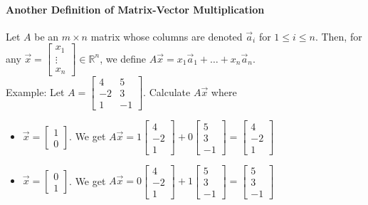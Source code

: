 \documentclass[10pt,letter]{article}
\begin{document}
\paragraph{Another Definition of Matrix-Vector Multiplication} Let $A$ be an $m\times n$ matrix whose columns are denoted $\vec{a}_i$ for $1\leq i\leq n$. Then, for any $\vec{x}=\begin{bmatrix}x_1\\\vdots\\x_n\end{bmatrix}\in\mathbb{R}^n$, we define $A\vec{x}=x_1\vec{a}_1+\ldots+x_n\vec{a}_n$. \\ 
Example: Let $A = \begin{bmatrix}4&5\\-2&3\\1&-1\end{bmatrix}$. Calculate $A\vec{x}$ where \begin{itemize}
    \item $\vec{x}=\begin{bmatrix}1\\0\end{bmatrix}$. We get $A\vec{x}=1\begin{bmatrix}4\\-2\\1\end{bmatrix}+0\begin{bmatrix}5\\3\\-1\end{bmatrix} = \begin{bmatrix}4\\-2\\1\end{bmatrix}$ 
    \item $\vec{x}=\begin{bmatrix}0\\1\end{bmatrix}$. We get $A\vec{x}=0\begin{bmatrix}4\\-2\\1\end{bmatrix}+1\begin{bmatrix}5\\3\\-1\end{bmatrix} = \begin{bmatrix}5\\3\\-1\end{bmatrix}$ 

\end{itemize}
\end{document}
